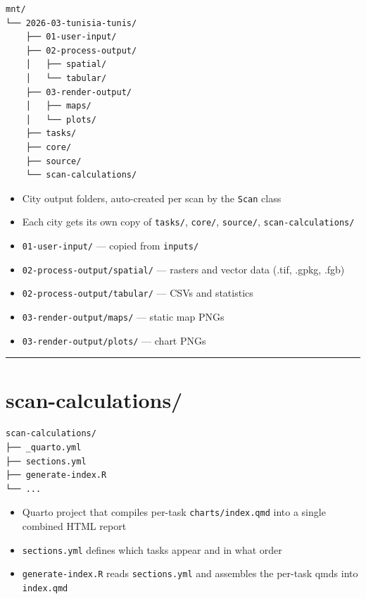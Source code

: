 \documentclass[
  letterpaper,
  DIV=11,
  numbers=noendperiod]{scrreprt}
\providecommand{\tightlist}{%
  \setlength{\itemsep}{0pt}\setlength{\parskip}{0pt}}
\begin{document}
\begin{verbatim}
mnt/
└── 2026-03-tunisia-tunis/
    ├── 01-user-input/
    ├── 02-process-output/
    │   ├── spatial/
    │   └── tabular/
    ├── 03-render-output/
    │   ├── maps/
    │   └── plots/
    ├── tasks/
    ├── core/
    ├── source/
    └── scan-calculations/
\end{verbatim}

\begin{itemize}
\tightlist
\item
  City output folders, auto-created per scan by the \texttt{Scan} class
\item
  Each city gets its own copy of \texttt{tasks/}, \texttt{core/},
  \texttt{source/}, \texttt{scan-calculations/}
\item
  \texttt{01-user-input/} --- copied from \texttt{inputs/}
\item
  \texttt{02-process-output/spatial/} --- rasters and vector data (.tif,
  .gpkg, .fgb)
\item
  \texttt{02-process-output/tabular/} --- CSVs and statistics
\item
  \texttt{03-render-output/maps/} --- static map PNGs
\item
  \texttt{03-render-output/plots/} --- chart PNGs
\end{itemize}

\begin{center}\rule{0.5\linewidth}{0.5pt}\end{center}

\section{scan-calculations/}\label{scan-calculations}

\begin{verbatim}
scan-calculations/
├── _quarto.yml
├── sections.yml
├── generate-index.R
└── ...
\end{verbatim}

\begin{itemize}
\tightlist
\item
  Quarto project that compiles per-task \texttt{charts/index.qmd} into a
  single combined HTML report
\item
  \texttt{sections.yml} defines which tasks appear and in what order
\item
  \texttt{generate-index.R} reads \texttt{sections.yml} and assembles
  the per-task qmds into \texttt{index.qmd}
\end{itemize}
\end{document}
